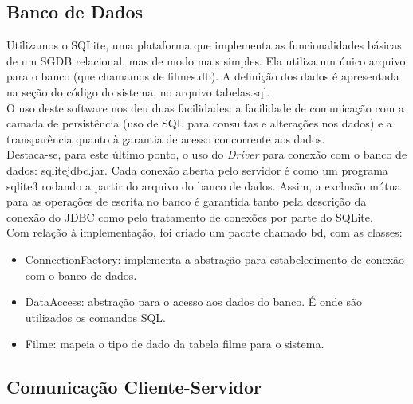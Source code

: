 \documentclass[11pt,twoside]{article}
\begin{document}
\subsection{Banco de Dados}
Utilizamos o SQLite, uma plataforma que implementa as funcionalidades básicas de um SGDB relacional, mas de modo mais simples. Ela utiliza um único arquivo para o banco (que chamamos de filmes.db). A definição dos dados é apresentada na seção do código do sistema, no arquivo tabelas.sql.\\
O uso deste software nos deu duas facilidades: a facilidade de comunicação com a camada de persistência (uso de SQL para consultas e alterações nos dados) e a transparência quanto à garantia de acesso concorrente aos dados.\\
Destaca-se, para este último ponto, o uso do \textit{Driver} para conexão com o banco de dados: sqlitejdbc.jar. Cada conexão aberta pelo servidor é como um programa sqlite3 rodando a partir do arquivo do banco de dados. Assim, a exclusão mútua para as operações de escrita no banco é garantida tanto pela descrição da conexão do JDBC como pelo tratamento de conexões por parte do SQLite.\\
Com relação à implementação, foi criado um pacote chamado bd, com as classes:
\begin{itemize}
  \item ConnectionFactory: implementa a abstração para estabelecimento de conexão com o banco de dados.
  \item DataAccess: abstração para o acesso aos dados do banco. É onde são utilizados os comandos SQL.
  \item Filme: mapeia o tipo de dado da tabela filme para o sistema.
\end{itemize}


\subsection{Comunicação Cliente-Servidor}
\end{document}
